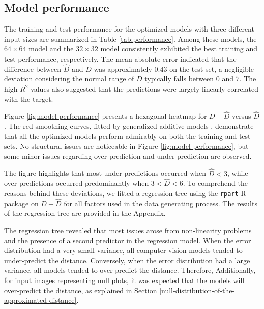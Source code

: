 \documentclass[]{interact}
\theoremstyle{plain}%
\theoremstyle{definition}
\theoremstyle{remark}
\begin{document}
\hypertarget{model-performance}{%
\subsection{Model performance}\label{model-performance}}

The training and test performance for the optimized models with three
different input sizes are summarized in Table \ref{tab:performance}.
Among these models, the \(64 \times 64\) model and the \(32 \times 32\)
model consistently exhibited the best training and test performance,
respectively. The mean absolute error indicated that the difference
between \(\hat{D}\) and \(D\) was approximately \(0.43\) on the test
set, a negligible deviation considering the normal range of \(D\)
typically falls between \(0\) and \(7\). The high \(R^2\) values also
suggested that the predictions were largely linearly correlated with the
target.

Figure \ref{fig:model-performance} presents a hexagonal heatmap for
\(D - \hat{D}\) versus \(\hat{D}\). The red smoothing curves, fitted by
generalized additive models \citep{hastie2017generalized}, demonstrate
that all the optimized models perform admirably on both the training and
test sets. No structural issues are noticeable in Figure
\ref{fig:model-performance}, but some minor issues regarding
over-prediction and under-prediction are observed.

The figure highlights that most under-predictions occurred when
\(\hat{D} < 3\), while over-predictions occurred predominantly when
\(3 < \hat{D} < 6\). To comprehend the reasons behind these deviations,
we fitted a regression tree using the \texttt{rpart} R package
\citep{Terry2022rpart} on \(D - \hat{D}\) for all factors used in the
data generating process. The results of the regression tree are provided
in the Appendix.

The regression tree revealed that most issues arose from non-linearity
problems and the presence of a second predictor in the regression model.
When the error distribution had a very small variance, all computer
vision models tended to under-predict the distance. Conversely, when the
error distribution had a large variance, all models tended to
over-predict the distance. Therefore, Additionally, for input images
representing null plots, it was expected that the models will
over-predict the distance, as explained in Section
\ref{null-distribution-of-the-approximated-distance}.
\end{document}
